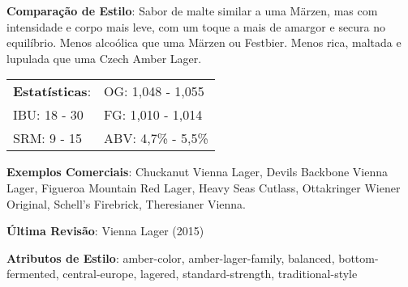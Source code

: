 \textbf{Comparação de Estilo}: Sabor de malte similar a uma Märzen, mas com intensidade e corpo mais leve, com um toque a mais de amargor e secura no equilíbrio. Menos alcoólica que uma Märzen ou Festbier. Menos rica, maltada e lupulada que uma Czech Amber Lager.

\begin{tabular}{@{}p{35mm}p{35mm}@{}}
  \textbf{Estatísticas}: & OG: 1,048 - 1,055 \\
  IBU: 18 - 30 & FG: 1,010 - 1,014 \\
  SRM: 9 - 15 & ABV: 4,7\% - 5,5\%
\end{tabular}

\textbf{Exemplos Comerciais}: Chuckanut Vienna Lager, Devils Backbone Vienna Lager, Figueroa Mountain Red Lager, Heavy Seas Cutlass, Ottakringer Wiener Original, Schell’s Firebrick, Theresianer Vienna.

\textbf{Última Revisão}: Vienna Lager (2015)

\textbf{Atributos de Estilo}: amber-color, amber-lager-family, balanced, bottom-fermented, central-europe, lagered, standard-strength, traditional-style

